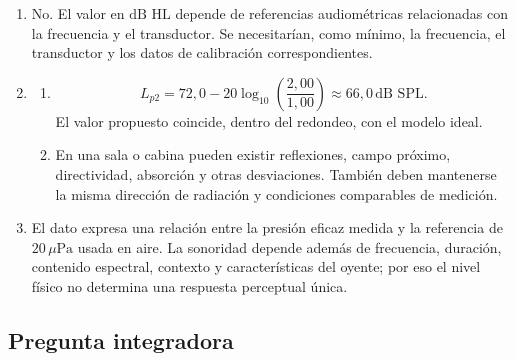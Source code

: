 \begin{enumerate}[label=\textbf{F\arabic*.},leftmargin=*]
    \item No. El valor en \(\text{dB HL}\) depende de referencias
    audiométricas relacionadas con la frecuencia y el transductor. Se
    necesitarían, como mínimo, la frecuencia, el transductor y los datos de
    calibración correspondientes.

    \item
    \begin{enumerate}[label=\alph*)]
        \item
        \[
            L_{p2}
              =72{,}0-20\log_{10}\!\left(
                 \frac{2{,}00}{1{,}00}\right)
              \approx66{,}0\,\text{dB SPL}.
        \]
        El valor propuesto coincide, dentro del redondeo, con el modelo ideal.
        \item En una sala o cabina pueden existir reflexiones, campo próximo,
        directividad, absorción y otras desviaciones. También deben mantenerse
        la misma dirección de radiación y condiciones comparables de
        medición.
    \end{enumerate}

    \item El dato expresa una relación entre la presión eficaz medida y la
    referencia de \(20\,\mu\text{Pa}\) usada en aire. La sonoridad depende
    además de frecuencia, duración, contenido espectral, contexto y
    características del oyente; por eso el nivel físico no determina una
    respuesta perceptual única.
\end{enumerate}

\subsection*{Pregunta integradora}

